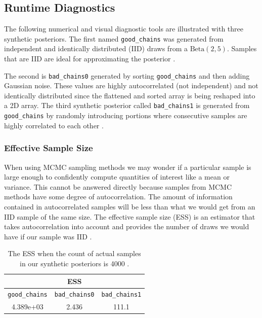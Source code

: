 \documentclass[../../../main.tex]{subfiles}
\begin{document}
\subsection{Runtime Diagnostics}\label{Appendix:RuntimeDiagnostics}

The following numerical and visual diagnostic tools are illustrated with three synthetic posteriors. The first named \texttt{good\_chains} was generated from independent and identically distributed (IID) draws from a $\mathrm{Beta}(2,5)$. Samples that are IID are ideal for approximating the posterior \autocite{Martin2021}.

The second is \texttt{bad\_chains0} generated by sorting \texttt{good\_chains} and then adding Gaussian noise. These values are highly autocorrelated (not independent) and not identically distributed since the flattened and sorted array is being reshaped into a 2D array. The third synthetic posterior called \texttt{bad\_chains1} is generated from \texttt{good\_chains} by randomly introducing portions where consecutive samples are highly correlated to each other \autocite{Martin2021}.

\subsubsection{Effective Sample Size}

When using MCMC sampling methods we may wonder if a particular sample is large enough to confidently compute quantities of interest like a mean or variance. This cannot be answered directly because samples from MCMC methods have some degree of autocorrelation. The amount of information contained in autocorrelated samples will be less than what we would get from an IID sample of the same size. The effective sample size (ESS) is an estimator that takes autocorrelation into account and provides the number of draws we would have if our sample was IID \autocite{Martin2021}.

\begin{table}[!htbp]
\centering
\caption[Synthetic posteriors ESS]{The ESS when the count of actual samples in our synthetic posteriors is 4000 \autocite{Martin2021}.}
\begin{tabular}{ccc}
\toprule
\multicolumn{3}{c}{\textbf{ESS}} \\
\midrule
\texttt{good\_chains} & \texttt{bad\_chains0} & \texttt{bad\_chains1} \\
\midrule
4.389e+03 & 2.436 & 111.1 \\
\bottomrule
\end{tabular}
\end{table}
\end{document}
